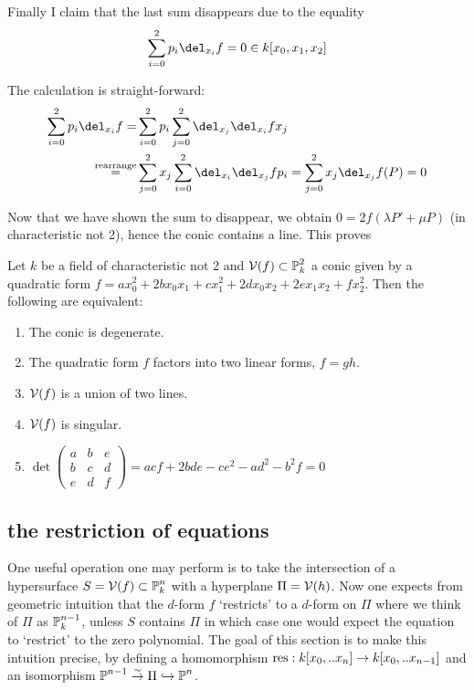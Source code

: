 Finally I claim that the last sum disappears due to the equality
\begin{equation}
\sum_{i=0}^2 p_i \del_{x_i}f = 0 \in k[x_0,x_1,x_2]
\end{equation}

The calculation is straight-forward:
\begin{align}
\sum_{i=0}^2 p_i \del_{x_i} f
=& \sum_{i=0}^2 p_i \sum_{j=0}^2 \del_{x_j}\del_{x_i}fx_j
\\
\overset{\text{rearrange}}=& \sum_{j=0}^2 x_j \sum_{i=0}^2 \del_{x_i}\del_{x_j}fp_i = \sum_{j=0}^2 x_j \del_{x_j}f(P) = 0
\end{align}

Now that we have shown the sum to disappear, we obtain $0 = 2f(\lambda P' + \mu P)$ (in characteristic not 2), hence the conic contains a line. This proves

\begin{theorem}
Let $k$ be a field of characteristic not 2 and $\operatorname{\mathcal V}(f) \subset \operatorname{\mathbb P}^2_k$ a conic given by a quadratic form $f = ax_0^2 + 2bx_0x_1 + cx_1^2 + 2dx_0x_2 + 2ex_1x_2 + fx_2^2$.
Then the following are equivalent:
\begin{enumerate}
\item The conic is degenerate.
\item The quadratic form $f$ factors into two linear forms, $f=gh$.
\item $\operatorname{\mathcal V}(f)$ is a union of two lines.
\item $\operatorname{\mathcal V}(f)$ is singular.
\item $\det
\begin{pmatrix}
a & b & e \\
b & c & d \\
e & d & f
\end{pmatrix}
= acf + 2bde - ce^2 - ad^2 - b^2f = 0$
\end{enumerate}
\end{theorem}






\subsection{the restriction of equations}


One useful operation one may perform is to take the intersection of a hypersurface $S = \operatorname{\mathcal V}(f) \subset \operatorname{\mathbb P}^n_k$ with a hyperplane $\Pi = \operatorname{\mathcal V}(h)$. Now one expects from geometric intuition that the $d$-form $f$ `restricts' to a $d$-form on $\Pi$ where we think of $\Pi$ as $\operatorname{\mathbb P}^{n-1}_k$, unless $S$ contains $\Pi$ in which case one would expect the equation to `restrict' to the zero polynomial.
The goal of this section is to make this intuition precise, by defining a homomorphism ${\operatorname{res}} : k[x_0,..x_n] \to k[x_0,..x_{n-1}]$ and an isomorphism $\operatorname{\mathbb P}^{n-1} \overset\sim\to \Pi \hookrightarrow \operatorname{\mathbb P}^n$.

